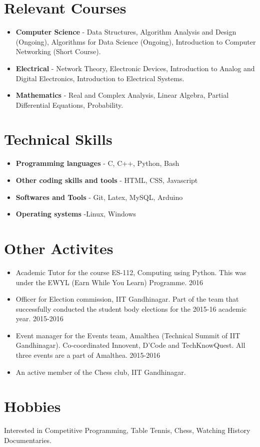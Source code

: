 \documentclass[margin, centered]{res}
\begin{document}
\begin{resume}
\section{Relevant Courses}
\begin{itemize}[leftmargin=*]
\item {\bf Computer Science} - Data Structures, Algorithm Analysis and Design (Ongoing), Algorithms for Data Science (Ongoing), Introduction to Computer Networking (Short Course).
\item {\bf Electrical} - Network Theory, Electronic Devices, Introduction to Analog and Digital Electronics, Introduction to Electrical Systems.
\item {\bf Mathematics} - Real and Complex Analysis, Linear Algebra, Partial Differential Equations, Probability.
\end{itemize}

\section{Technical Skills}
\begin{itemize}[leftmargin=*]
\item {\bf Programming languages} - C, C++, Python, Bash
\item {\bf Other coding skills and tools} - HTML, CSS, Javascript
\item {\bf Softwares and Tools} - Git, Latex, MySQL, Arduino
\item {\bf Operating systems} -Linux, Windows
\end{itemize}

\section{Other Activites}
\begin{itemize}[leftmargin=*]
\item Academic Tutor for the course ES-112, Computing using Python. This was under the EWYL (Earn While You Learn) Programme. 
\hfill {2016}
\item Officer for Election commission, IIT Gandhinagar. Part of the team that successfully conducted the student body elections for the 2015-16 academic year.
\hfill{2015-2016}
\item Event manager for the Events team, Amalthea (Technical Summit of IIT Gandhinagar). Co-coordinated Innovent, D’Code and TechKnowQuest. All three events are a part of Amalthea.
\hfill{2015-2016}
\item An active member of the Chess club, IIT Gandhinagar.
\end{itemize}

\section{Hobbies}Interested in Competitive Programming, Table Tennis, Chess, Watching History Documentaries.

\end{resume}
\end{document}
